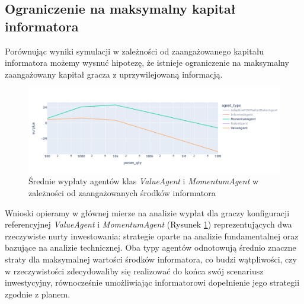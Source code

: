 \subsection{Ograniczenie na maksymalny kapitał informatora} 
Porównując wyniki symulacji w zależności od zaangażowanego kapitału informatora możemy wysnuć hipotezę, że istnieje ograniczenie na maksymalny zaangażowany kapitał gracza z uprzywilejowaną informacją. 
\begin{center}
\begin{figure}
\begin{center}
\includegraphics[scale=0.4]{kapital.png}
\end{center}
\caption{Średnie wypłaty agentów klas \textit{ValueAgent} i \textit{MomentumAgent} w zależności od zaangażowanych środków informatora}\label{fig:capital}
\end{figure}
\end{center}
Wnioski opieramy w głównej mierze na analizie wypłat dla graczy konfiguracji referencyjnej \textit{ValueAgent} i \textit{MomentumAgent} (Rysunek \ref{fig:capital}) reprezentujących dwa rzeczywiste nurty inwestowania: strategie oparte na analizie fundamentalnej oraz bazujące na analizie technicznej. Oba typy agentów odnotowują średnio znaczne straty dla maksymalnej wartości środków informatora, co budzi wątpliwości, czy w rzeczywistości zdecydowaliby się realizować do końca swój scenariusz inwestycyjny, równocześnie umożliwiając informatorowi dopełnienie jego strategii zgodnie z planem. 


